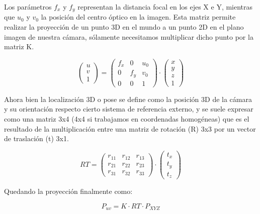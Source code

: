 \documentclass{bmvc2k}
\begin{document}
Los parámetros $f_{x}$ y $f_{y}$ representan la distancia focal en los ejes X e Y, mientras que $u_{0}$ y $v_{0}$ la posición del centro óptico en la imagen. Esta matriz permite realizar la proyección de un punto 3D en el mundo a un punto 2D en el plano
imagen de nuestra cámara, sólamente necesitamos multiplicar dicho punto por la matriz K.


\begin{equation}\label{eq:proyection}
\begin{pmatrix}
u\\
v\\
1
\end{pmatrix}=\begin{pmatrix}
f_{x} & 0 & u_{0} \\
0 & f_{y} & v_{0} \\
0 & 0 & 1
\end{pmatrix}\cdot\begin{pmatrix}
x\\
y\\
z \\
1
\end{pmatrix}
\end{equation}



Ahora bien la localización 3D o pose se define como la posición 3D de la cámara y su orientación respecto cierto sistema de referencia externo, y se suele expresar como una matriz 3x4 (4x4 si trabajamos en coordenadas homogéneas) que es el resultado de la multiplicación entre una matriz de rotación (R) 3x3 por un vector de traslación (t) 3x1.

\begin{equation}\label{eq:matrizRT}
RT=\begin{pmatrix}
r_{11} & r_{12} & r_{13} \\
r_{21} & r_{22} & r_{23} \\
r_{31} & r_{32} & r_{33}
\end{pmatrix}\cdot \begin{pmatrix}
t_{x}\\
t_{y}\\
t_{z}
\end{pmatrix}
\end{equation}

Quedando la proyección finalmente como:

\begin{equation}\label{eq:ProyectionDef}
P_{uv}=K\cdot RT\cdot P_{XYZ}
\end{equation}
\end{document}
